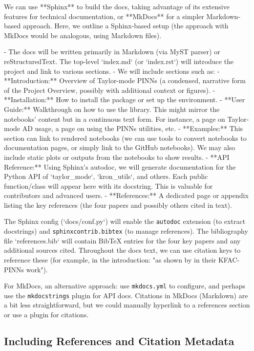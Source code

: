 \documentclass[11pt]{article}
\begin{document}
We can use **Sphinx** to build the docs, taking advantage of its extensive features for technical documentation, or **MkDocs** for a simpler Markdown-based approach. Here, we outline a Sphinx-based setup (the approach with MkDocs would be analogous, using Markdown files).

- The docs will be written primarily in Markdown (via MyST parser) or reStructuredText. The top-level `index.md` (or `index.rst`) will introduce the project and link to various sections.
- We will include sections such as:
  - **Introduction:** Overview of Taylor-mode PINNs (a condensed, narrative form of the Project Overview, possibly with additional context or figures).
  - **Installation:** How to install the package or set up the environment.
  - **User Guide:** Walkthrough on how to use the library. This might mirror the notebooks' content but in a continuous text form. For instance, a page on Taylor-mode AD usage, a page on using the PINNs utilities, etc.
  - **Examples:** This section can link to rendered notebooks (we can use tools to convert notebooks to documentation pages, or simply link to the GitHub notebooks). We may also include static plots or outputs from the notebooks to show results.
  - **API Reference:** Using Sphinx's autodoc, we will generate documentation for the Python API of `taylor_mode`, `kron_utils`, and others. Each public function/class will appear here with its docstring. This is valuable for contributors and advanced users.
  - **References:** A dedicated page or appendix listing the key references (the four papers and possibly others cited in text).

The Sphinx config (`docs/conf.py`) will enable the \texttt{autodoc} extension (to extract docstrings) and \texttt{sphinxcontrib.bibtex} (to manage references). The bibliography file `references.bib` will contain BibTeX entries for the four key papers and any additional sources cited. Throughout the docs text, we can use citation keys to reference these (for example, in the introduction: "as shown by \cite{Dangel2024} in their KFAC-PINNs work").

For MkDocs, an alternative approach: use \texttt{mkdocs.yml} to configure, and perhaps use the \texttt{mkdocstrings} plugin for API docs. Citations in MkDocs (Markdown) are a bit less straightforward, but we could manually hyperlink to a references section or use a plugin for citations.

\subsection{Including References and Citation Metadata}
\end{document}
